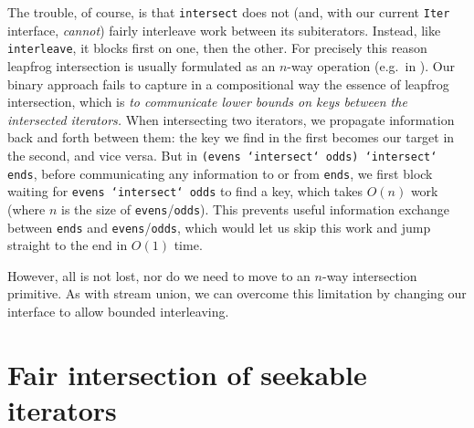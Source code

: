 \documentclass[acmsmall,screen,review,anonymous,dvipsnames,svgnames]{acmart}
\newcommand\hask[1]{\texttt{#1}}
\newcommand\ttt\texttt
\begin{document}
The trouble, of course, is that \ttt{intersect} does not (and, with our current \hask{Iter} interface, \emph{cannot}) fairly interleave work between its subiterators.
Instead, like \ttt{interleave}, it blocks first on one, then the other.
For precisely this reason leapfrog intersection is usually formulated as an $n$-way operation (e.g.\ in \citet{lftj}).
Our binary approach fails to capture in a compositional way the essence of leapfrog intersection, which is \emph{to communicate lower bounds on keys between the intersected iterators.}
When intersecting two iterators, we propagate information back and forth between them: the key we find in the first becomes our target in the second, and vice versa.
But in \ttt{(evens `intersect` odds) `intersect` ends}, before communicating any information to or from \ttt{ends}, we first block waiting for \ttt{evens `intersect` odds} to find a key, which takes $O(n)$ work (where $n$ is the size of \ttt{evens}/\ttt{odds}).
This prevents useful information exchange between \ttt{ends} and \ttt{evens}/\ttt{odds}, which would let us skip this work and jump straight to the end in $O(1)$ time.

However, all is not lost, nor do we need to move to an $n$-way intersection primitive.
As with stream union, we can overcome this limitation by changing our interface to allow bounded interleaving.


\section{Fair intersection of seekable iterators}
\end{document}
